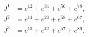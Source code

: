 \begin{equation}
\begin{aligned}
   J^1 &= e^{12} + e^{34} + e^{56} + e^{78} , \\
   J^2 &= e^{14} + e^{23} + e^{58} + e^{67} , \\
   J^3 &= e^{13} + e^{42} + e^{57} + e^{86} .
\end{aligned}
\end{equation}

